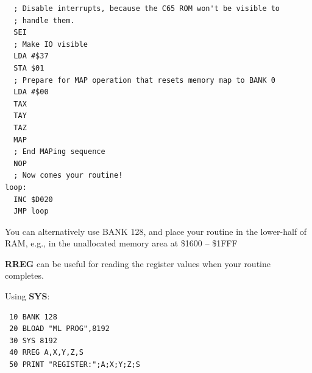 \begin{description}[leftmargin=2cm,style=nextline]
\newpage
\begin{tcolorbox}[colback=black,coltext=white]
\verbatimfont{\codefont}
\begin{verbatim}
  ; Disable interrupts, because the C65 ROM won't be visible to
  ; handle them.
  SEI
  ; Make IO visible
  LDA #$37
  STA $01
  ; Prepare for MAP operation that resets memory map to BANK 0
  LDA #$00
  TAX
  TAY
  TAZ
  MAP
  ; End MAPing sequence
  NOP
  ; Now comes your routine!
loop:
  INC $D020
  JMP loop
\end{verbatim}
\end{tcolorbox}

\item [Remarks:] You can alternatively use BANK 128, and place your
  routine in the lower-half of RAM, e.g., in the unallocated memory
  area at \$1600 -- \$1FFF

\item [Remarks:] {\bf RREG} can be useful for reading the
  register values when your routine completes.


\item [Example:] Using {\bf SYS}:
\begin{tcolorbox}[colback=black,coltext=white]
\verbatimfont{\codefont}
\begin{verbatim}
 10 BANK 128
 20 BLOAD "ML PROG",8192
 30 SYS 8192
 40 RREG A,X,Y,Z,S
 50 PRINT "REGISTER:";A;X;Y;Z;S
\end{verbatim}
\end{tcolorbox}

\end{description}


\newpage
